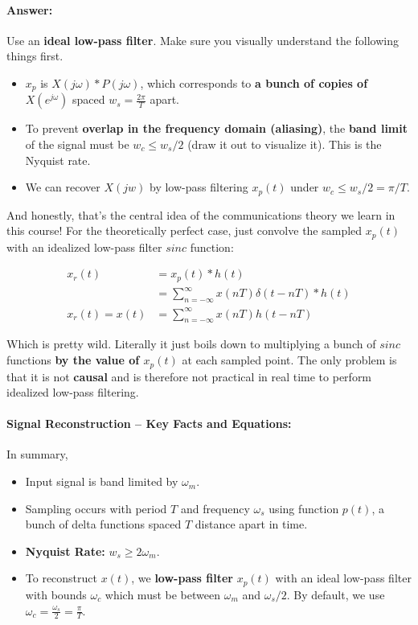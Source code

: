 \documentclass[a4paper,12pt]{report}
\begin{document}
\paragraph{Answer: } Use an \textbf{ideal low-pass filter}. Make sure you visually understand the following things first.
\begin{itemize}
\item $x_p$ is $X(j\omega)*P(j\omega)$, which corresponds to \textbf{a bunch of copies of $X(e^{j\omega})$} spaced $w_s = \frac{2\pi}{T}$ apart. 
\item To prevent \textbf{overlap in the frequency domain (aliasing)}, the \textbf{band limit} of the signal must be $w_c \leq w_s/2$ (draw it out to visualize it). This is the Nyquist rate.
\item We can recover $X(jw)$ by low-pass filtering $x_p(t)$ under $w_c \leq w_s/2 = \pi/T$. 
\end{itemize}



And honestly, that's the central idea of the communications theory we learn in this course! For the theoretically perfect case, just convolve the sampled $x_p(t)$ with an idealized low-pass filter $sinc$ function: 

\begin{align}
x_r(t) &= x_p(t) * h(t) \\ 
&= \sum_{n=-\infty}^{\infty} x(nT)\delta(t-nT)*h(t) \\
x_r(t) = x(t) &= \sum_{n=-\infty}^{\infty} x(nT)h(t-nT)
\end{align}

Which is pretty wild. Literally it just boils down to multiplying a bunch of $sinc$ functions \textbf{by the value of $x_p(t)$} at each sampled point. The only problem is that it is not \textbf{causal} and is therefore not practical in real time to perform idealized low-pass filtering. 


\paragraph{Signal Reconstruction -- Key Facts and Equations: } In summary,
\begin{itemize}
\item Input signal is band limited by $\omega_m$.
\item Sampling occurs with period $T$ and frequency $\omega_s$ using function $p(t)$, a bunch of delta functions spaced $T$ distance apart in time. 
\item \textbf{Nyquist Rate: } $w_s \geq 2\omega_m$.
\item To reconstruct $x(t)$, we \textbf{low-pass filter} $x_p(t)$ with an ideal low-pass filter with bounds $\omega_c$ which must be between $\omega_m$ and $\omega_s/2$. By default, we use $\omega_c = \frac{\omega_s}{2} = \frac{\pi}{T}$.
\end{itemize}
\end{document}
